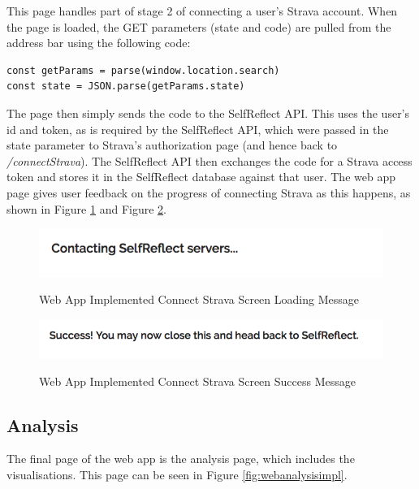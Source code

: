 \documentclass[11pt,openright,a4paper]{report}
\begin{document}
This page handles part of stage 2 of connecting a user's Strava account. When the page is loaded, the GET parameters (state and code) are pulled from the address bar using the following code:
\begin{lstlisting}
const getParams = parse(window.location.search)
const state = JSON.parse(getParams.state)
\end{lstlisting}

The page then simply sends the code to the SelfReflect API. This uses the user's id and token, as is required by the SelfReflect API, which were passed in the state parameter to Strava's authorization page (and hence back to \emph{/connectStrava}). The SelfReflect API then exchanges the code for a Strava access token and stores it in the SelfReflect database against that user. The web app page gives user feedback on the progress of connecting Strava as this happens, as shown in Figure \ref{fig:webstravaloading} and Figure \ref{fig:webstravasuccess}.

\begin{figure}[ht]
\centering
\caption{Web App Implemented Connect Strava Screen Loading Message}
\includegraphics[width=.75\textwidth]{i/webstravaloading.png}
\label{fig:webstravaloading}
\end{figure}

\begin{figure}[ht]
\centering
\caption{Web App Implemented Connect Strava Screen Success Message}
\includegraphics[width=.75\textwidth]{i/webstravasuccess.png}
\label{fig:webstravasuccess}
\end{figure}

\newpage
\subsection{Analysis}
The final page of the web app is the analysis page, which includes the visualisations. This page can be seen in Figure \ref{fig:webanalysisimpl}.
\end{document}

